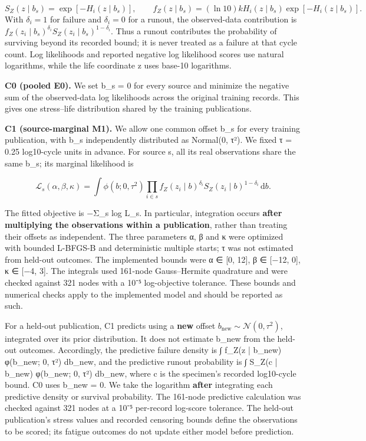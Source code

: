 \documentclass[12pt,a4paper]{article}
\begin{document}
\begin{equation}
S_Z(z\mid b_s)=\exp[-H_i(z\mid b_s)],\qquad
f_Z(z\mid b_s)=(\ln 10)kH_i(z\mid b_s)\exp[-H_i(z\mid b_s)].
\end{equation}
With \(\delta_i=1\) for failure and \(\delta_i=0\) for a runout, the observed-data contribution is \(f_Z(z_i\mid b_s)^{\delta_i}S_Z(z_i\mid b_s)^{1-\delta_i}\). Thus a runout contributes the probability of surviving beyond its recorded bound; it is never treated as a failure at that cycle count. Log likelihoods and reported negative log likelihood scores use natural logarithms, while the life coordinate z uses base-10 logarithms.

\textbf{C0 (pooled E0).} We set b\_s = 0 for every source and minimize the negative sum of the observed-data log likelihoods across the original training records. This gives one stress–life distribution shared by the training publications.

\textbf{C1 (source-marginal M1).} We allow one common offset b\_s for every training publication, with b\_s independently distributed as Normal(0, τ²). We fixed τ = 0.25 log10-cycle units in advance. For source s, all its real observations share the same b\_s; its marginal likelihood is

\begin{equation}
\mathcal L_s(\alpha,\beta,\kappa)=\int \phi(b;0,\tau^2)\prod_{i\in s}f_Z(z_i\mid b)^{\delta_i}S_Z(z_i\mid b)^{1-\delta_i}\,\mathrm{d}b.
\end{equation}

The fitted objective is −Σ\_s log L\_s. In particular, integration occurs \textbf{after multiplying the observations within a publication}, rather than treating their offsets as independent. The three parameters α, β and κ were optimized with bounded L-BFGS-B and deterministic multiple starts; τ was not estimated from held-out outcomes. The implemented bounds were α ∈ [0, 12], β ∈ [−12, 0], κ ∈ [−4, 3]. The integrals used 161-node Gauss–Hermite quadrature and were checked against 321 nodes with a 10⁻⁵ log-objective tolerance. These bounds and numerical checks apply to the implemented model and should be reported as such.

For a held-out publication, C1 predicts using a \textbf{new} offset \(b_{\mathrm{new}}\sim\mathcal N(0,\tau^2)\), integrated over its prior distribution. It does not estimate b\_new from the held-out outcomes. Accordingly, the predictive failure density is ∫ f\_Z(z | b\_new) φ(b\_new; 0, τ²) db\_new, and the predictive runout probability is ∫ S\_Z(c | b\_new) φ(b\_new; 0, τ²) db\_new, where c is the specimen's recorded log10-cycle bound. C0 uses b\_new = 0. We take the logarithm \textbf{after} integrating each predictive density or survival probability. The 161-node predictive calculation was checked against 321 nodes at a 10⁻⁵ per-record log-score tolerance. The held-out publication's stress values and recorded censoring bounds define the observations to be scored; its fatigue outcomes do not update either model before prediction.
\end{document}
